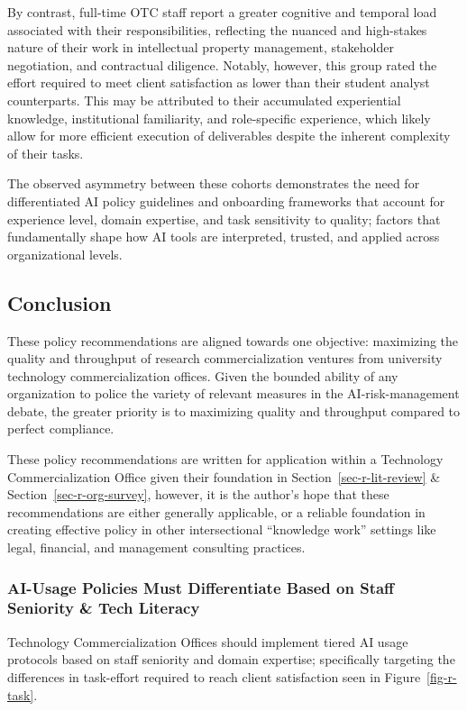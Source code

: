 \documentclass[
]{article}
\begin{document}
By contrast, full-time OTC staff report a greater cognitive and temporal
load associated with their responsibilities, reflecting the nuanced and
high-stakes nature of their work in intellectual property management,
stakeholder negotiation, and contractual diligence. Notably, however,
this group rated the effort required to meet client satisfaction as
lower than their student analyst counterparts. This may be attributed to
their accumulated experiential knowledge, institutional familiarity, and
role-specific experience, which likely allow for more efficient
execution of deliverables despite the inherent complexity of their
tasks.

The observed asymmetry between these cohorts demonstrates the need for
differentiated AI policy guidelines and onboarding frameworks that
account for experience level, domain expertise, and task sensitivity to
quality; factors that fundamentally shape how AI tools are interpreted,
trusted, and applied across organizational levels.

\subsection{Conclusion}\label{conclusion}

These policy recommendations are aligned towards one objective:
maximizing the quality and throughput of research commercialization
ventures from university technology commercialization offices. Given the
bounded ability of any organization to police the variety of relevant
measures in the AI-risk-management debate, the greater priority is to
maximizing quality and throughput compared to perfect compliance.

These policy recommendations are written for application within a
Technology Commercialization Office given their foundation in
Section~\ref{sec-r-lit-review} \& Section~\ref{sec-r-org-survey},
however, it is the author's hope that these recommendations are either
generally applicable, or a reliable foundation in creating effective
policy in other intersectional ``knowledge work'' settings like legal,
financial, and management consulting practices.

\subsubsection{AI-Usage Policies Must Differentiate Based on Staff
Seniority \& Tech Literacy}\label{sec-r-seniority}

Technology Commercialization Offices should implement tiered AI usage
protocols based on staff seniority and domain expertise; specifically
targeting the differences in task-effort required to reach client
satisfaction seen in Figure~\ref{fig-r-task}.
\end{document}
